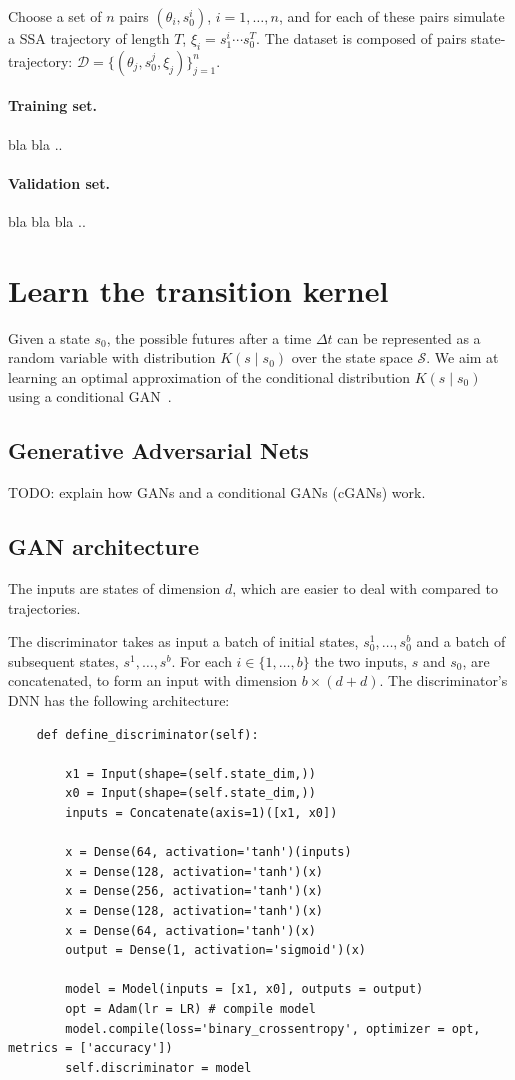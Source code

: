 \documentclass{article}
\begin{document}
Choose a set of $n$ pairs $(\theta_i,s_0^i)$, $i=1,\dots,n$, and for each of these pairs simulate a SSA trajectory of length $T$, $\xi_i = s_1^i\cdots s_0^T$. The dataset is composed of pairs state-trajectory: $\mathcal{D}= \{(\theta_j,s_0^j,\xi_j)\}_{j=1}^n$.

\paragraph{Training set. } bla bla ..

\paragraph{Validation set.} bla bla bla ..

\section{Learn the transition kernel}

Given a state $s_0$, the possible futures after a time $\Delta t$ can be represented as a random variable with distribution $K(s\mid s_0)$ over the state space $\mathcal{S}$. We aim at learning an optimal approximation of the conditional distribution $K(s\mid s_0)$ using a conditional GAN~\cite{mirza2014conditional}.

\subsection{Generative Adversarial Nets}
TODO: explain how GANs and a conditional GANs (cGANs) work.

\subsection{GAN architecture}

The inputs are states of dimension $d$, which are easier to deal with compared to trajectories.

The discriminator takes as input  a batch of initial states, $s_0^1,\dots , s_0^b$ and a batch of subsequent states, $s^1,\dots , s^b$. For each $i\in\{ 1,\dots , b\}$ the two inputs, $s$ and $s_0$, are concatenated, to form an input with dimension $b\times (d+d)$. The discriminator's DNN has the following architecture:

\begin{lstlisting}
    def define_discriminator(self):

		x1 = Input(shape=(self.state_dim,))
		x0 = Input(shape=(self.state_dim,)) 
		inputs = Concatenate(axis=1)([x1, x0])

		x = Dense(64, activation='tanh')(inputs)
		x = Dense(128, activation='tanh')(x)
		x = Dense(256, activation='tanh')(x)
		x = Dense(128, activation='tanh')(x)
		x = Dense(64, activation='tanh')(x)
		output = Dense(1, activation='sigmoid')(x)
		
		model = Model(inputs = [x1, x0], outputs = output)
		opt = Adam(lr = LR) # compile model
		model.compile(loss='binary_crossentropy', optimizer = opt, metrics = ['accuracy'])
		self.discriminator = model
\end{lstlisting}
		
\end{document}

